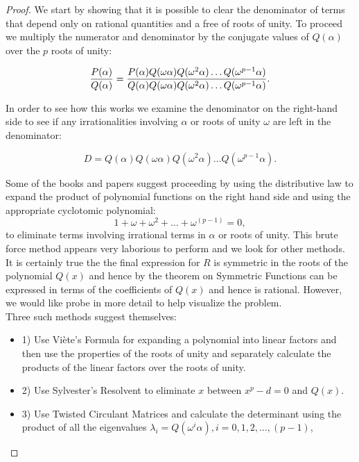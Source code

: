 \begin{proof}

We start by showing that it is possible to clear the denominator of terms that depend only on rational quantities and a free of roots of unity. To proceed we multiply the numerator and denominator by the conjugate values of $Q(\alpha)$ over the $p$ roots of unity: 

\[ {P(\alpha)  \over Q(\alpha) } = {P(\alpha) Q(\omega\alpha)Q(\omega^2\alpha) \hdots Q(\omega^{p-1}\alpha) \over Q(\alpha) Q(\omega\alpha)Q(\omega^2\alpha) \hdots Q(\omega^{p-1}\alpha)} . \]

In order to see how this works we examine the denominator on the right-hand side to see if any irrationalities involving $\alpha$ or roots of unity $\omega$ are left in the denominator:

\[ D =  Q(\alpha) Q(\omega\alpha)Q(\omega^2\alpha) \hdots Q(\omega^{p-1}\alpha) . \]

Some of the books and papers suggest proceeding by using the distributive law to expand the product of polynomial functions on the right hand side and using the appropriate cyclotomic polynomial: 
\[ 1 + \omega + \omega^2 + \hdots + \omega^{(p-1)} = 0,\] to eliminate terms involving irrational terms in $\alpha$ or roots of unity. This brute force method appears very laborious to perform and we look for other methods.
It is certainly true the the final expression for $R$ is symmetric in the roots of the polynomial $Q(x)$ and hence by the theorem on Symmetric Functions can be expressed in terms of the coefficients of $Q(x)$ and hence is rational. 
However, we would like probe in more detail to help visualize the problem. \\

Three such methods suggest themselves: \\
\begin{itemize}
\item[]1) Use Vi\`ete's Formula for expanding a polynomial into linear factors and then use the properties of the roots of unity and separately calculate the products of the linear factors over the roots of unity. 
\item[]2) Use Sylvester's Resolvent to eliminate $x$ between $x^p - d = 0$ and $Q(x)$. 
\item[]3) Use Twisted Circulant Matrices and calculate the determinant using the product of all the eigenvalues $\lambda_i = Q(\omega^i \alpha), i = 0,1,2,\hdots,(p-1)$,  
\end{itemize}


\end{proof}
